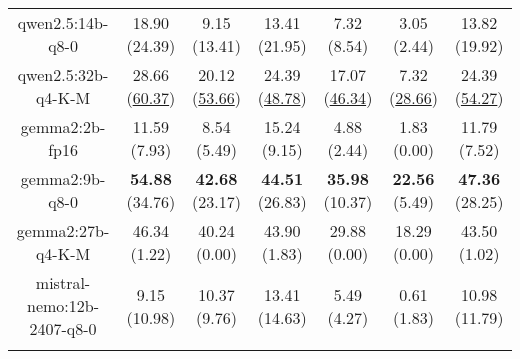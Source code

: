 \begin{table}[hbp]
{\begin{tabular}{ccccccc}
      \multicolumn{1}{c|}{qwen2.5:14b-q8-0} & 18.90 (24.39) & 9.15 (13.41) & \multicolumn{1}{c|}{13.41 (21.95)} & 7.32 (8.54) & \multicolumn{1}{c|}{3.05 (2.44)} & 13.82 (19.92) \\

      \multicolumn{1}{c|}{qwen2.5:32b-q4-K-M} & 28.66 (\underline{60.37}) & 20.12 (\underline{53.66}) & \multicolumn{1}{c|}{24.39 (\underline{48.78})} & 17.07 (\underline{46.34}) & \multicolumn{1}{c|}{7.32 (\underline{28.66})} & 24.39 (\underline{54.27}) \\

      \multicolumn{1}{c|}{gemma2:2b-fp16} & 11.59 (7.93) & 8.54 (5.49) & \multicolumn{1}{c|}{15.24 (9.15)} & 4.88 (2.44) & \multicolumn{1}{c|}{1.83 (0.00)} & 11.79 (7.52) \\

      \multicolumn{1}{c|}{gemma2:9b-q8-0} & \textbf{54.88} (34.76) & \textbf{42.68} (23.17) & \multicolumn{1}{c|}{\textbf{44.51} (26.83)} & \textbf{35.98} (10.37) & \multicolumn{1}{c|}{\textbf{22.56} (5.49)} & \textbf{47.36} (28.25) \\

      \multicolumn{1}{c|}{gemma2:27b-q4-K-M} & 46.34 (1.22) & 40.24 (0.00) & \multicolumn{1}{c|}{43.90 (1.83)} & 29.88 (0.00) & \multicolumn{1}{c|}{18.29 (0.00)} & 43.50 (1.02) \\

      \multicolumn{1}{c|}{mistral-nemo:12b-2407-q8-0} & 9.15 (10.98) & 10.37 (9.76) & \multicolumn{1}{c|}{13.41 (14.63)} & 5.49 (4.27) & \multicolumn{1}{c|}{0.61 (1.83)} & 10.98 (11.79) \\

      \\ \hline
    \end{tabular}%
  }
\end{table}